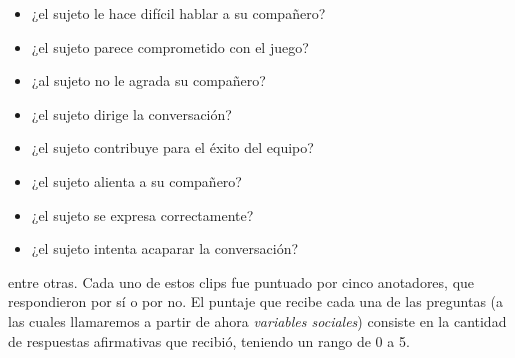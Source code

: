\begin{itemize}
  \item ¿el sujeto le hace difícil hablar a su compañero?
  \item ¿el sujeto parece comprometido con el juego?
  \item ¿al sujeto no le agrada su compañero?
  \item ¿el sujeto dirige la conversación?
  \item ¿el sujeto contribuye para el éxito del equipo?
  \item ¿el sujeto alienta a su compañero?
  \item ¿el sujeto se expresa correctamente?
  \item ¿el sujeto intenta acaparar la conversación?
\end{itemize}

entre otras. Cada uno de estos clips fue puntuado por cinco anotadores, que respondieron por sí o por no. El puntaje que recibe cada una de las preguntas (a las cuales llamaremos a partir de ahora \emph{variables sociales}) consiste en la cantidad de respuestas afirmativas que recibió, teniendo un rango de 0 a 5.

